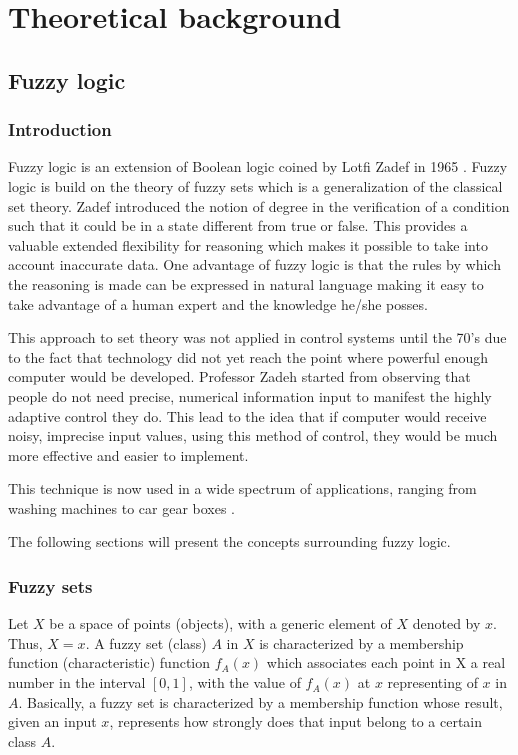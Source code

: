 \chapter{Theoretical background}
\label{chap:theoretical_brackground}

\section{Fuzzy logic}

\subsection{Introduction}

\qquad Fuzzy logic is an extension of Boolean logic coined by Lotfi Zadef in 1965 \cite{FuzzySets}
\cite{FuzzySets_NewApproach} \cite{FuzzySets_Algo}. Fuzzy logic is build on the theory of fuzzy sets which is
a generalization of the classical set theory. Zadef introduced the notion of degree in the verification of a
condition such that it could be in a state different from true or false. This provides a valuable extended
flexibility for reasoning which makes it possible to take into account inaccurate data. One advantage of fuzzy
logic is that the rules by which the reasoning is made can be expressed in natural language making it easy to
take advantage of a human expert and the knowledge he/she posses.

\qquad This approach to set theory was not applied in control systems until the 70's due to the fact that technology
did not yet reach the point where powerful enough computer would be developed. Professor Zadeh started from
observing that people do not need precise, numerical information input to manifest the highly adaptive control
they do. This lead to the idea that if computer would receive noisy, imprecise input values, using this
method of control, they would be much more effective and easier to implement.

\qquad This technique is now used in a wide spectrum of applications, ranging from washing machines to car gear
boxes \cite{INT:INT4550030208}.

The following sections will present the concepts surrounding fuzzy logic.

\subsection{Fuzzy sets}
\label{sec:fuzzy_sets}

\qquad Let $X$ be a space of points (objects), with a generic element of $X$ denoted by $x$. Thus, $X = {x}$.
A fuzzy set (class) $A$ in $X$ is characterized by a membership function (characteristic) function $f_{A}(x)$
which associates each point in X a real number in the interval $[0, 1]$, with the value of $f_{A}(x)$ at $x$
representing  of $x$ in $A$. \cite{Fuzyy_Sets}
Basically, a fuzzy set is characterized by a membership function whose result, given an input $x$, represents
how strongly does that input belong to a certain class $A$.

